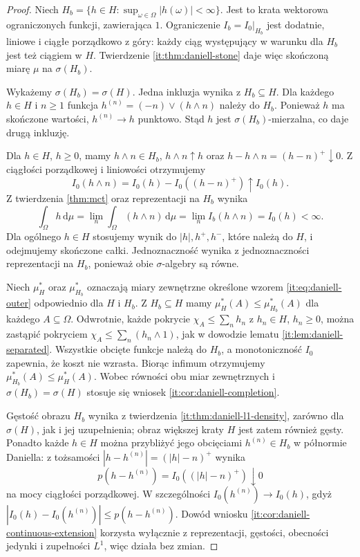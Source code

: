 \begin{proof}
Niech $H_b=\{h\in H:\sup_{\omega\in\Omega}|h(\omega)|<\infty\}$.
Jest to krata wektorowa ograniczonych funkcji, zawierająca
$1$. Ograniczenie $I_b=I_0|_{H_b}$ jest dodatnie,
liniowe i ciągłe porządkowo z góry: każdy ciąg
występujący w warunku dla $H_b$ jest też ciągiem w $H$.
Twierdzenie \ref{it:thm:daniell-stone} daje więc
skończoną miarę $\mu$ na $\sigma(H_b)$.

Wykażemy $\sigma(H_b)=\sigma(H)$.
Jedna inkluzja wynika z $H_b\subseteq H$.
Dla każdego $h\in H$ i $n\ge1$ funkcja
$h^{(n)}=(-n)\vee(h\wedge n)$ należy do $H_b$.
Ponieważ $h$ ma skończone wartości, $h^{(n)}\to h$
punktowo. Stąd $h$ jest $\sigma(H_b)$-mierzalna,
co daje drugą inkluzję.

Dla $h\in H$, $h\ge0$, mamy $h\wedge n\in H_b$,
$h\wedge n\uparrow h$ oraz
$h-h\wedge n=(h-n)^+\downarrow0$.
Z ciągłości porządkowej i liniowości otrzymujemy
\[
 I_0(h\wedge n)=I_0(h)-I_0((h-n)^+)\uparrow I_0(h).
\]
Z twierdzenia \ref{thm:mct} oraz reprezentacji na $H_b$
wynika
\[
 \int_\Omega h\,\mathrm d\mu
 =\lim_n\int_\Omega(h\wedge n)\,\mathrm d\mu
 =\lim_n I_b(h\wedge n)=I_0(h)<\infty.
\]
Dla ogólnego $h\in H$ stosujemy wynik do $|h|,h^+,h^-$,
które należą do $H$, i odejmujemy skończone całki.
Jednoznaczność wynika z jednoznaczności reprezentacji
na $H_b$, ponieważ obie $\sigma$-algebry są równe.

Niech $\mu_H^*$ oraz $\mu_{H_b}^*$ oznaczają
miary zewnętrzne określone wzorem
\eqref{it:eq:daniell-outer} odpowiednio dla $H$ i $H_b$.
Z $H_b\subseteq H$ mamy $\mu_H^*(A)\le\mu_{H_b}^*(A)$
dla każdego $A\subseteq\Omega$.
Odwrotnie, każde pokrycie $\chi_A\le\sum_n h_n$
z $h_n\in H$, $h_n\ge0$, można zastąpić pokryciem
$\chi_A\le\sum_n(h_n\wedge1)$, jak w dowodzie lematu
\ref{it:lem:daniell-separated}. Wszystkie obcięte
funkcje należą do $H_b$, a monotoniczność $I_0$
zapewnia, że koszt nie wzrasta. Biorąc infimum
otrzymujemy $\mu_{H_b}^*(A)\le\mu_H^*(A)$.
Wobec równości obu miar zewnętrznych i
$\sigma(H_b)=\sigma(H)$ stosuje się wniosek
\ref{it:cor:daniell-completion}.

Gęstość obrazu $H_b$ wynika z twierdzenia
\ref{it:thm:daniell-l1-density}, zarówno dla
$\sigma(H)$, jak i jej uzupełnienia; obraz większej
kraty $H$ jest zatem również gęsty.
Ponadto każde $h\in H$ można przybliżyć jego
obcięciami $h^{(n)}\in H_b$ w półnormie Daniella:
z tożsamości $|h-h^{(n)}|=(|h|-n)^+$ wynika
\[
 p(h-h^{(n)})=I_0((|h|-n)^+)\downarrow0
\]
na mocy ciągłości porządkowej. W szczególności
$I_0(h^{(n)})\to I_0(h)$, gdyż
$|I_0(h)-I_0(h^{(n)})|\le p(h-h^{(n)})$.
Dowód wniosku \ref{it:cor:daniell-continuous-extension}
korzysta wyłącznie z reprezentacji, gęstości,
obecności jedynki i zupełności $L^1$, więc
działa bez zmian.
\end{proof}

